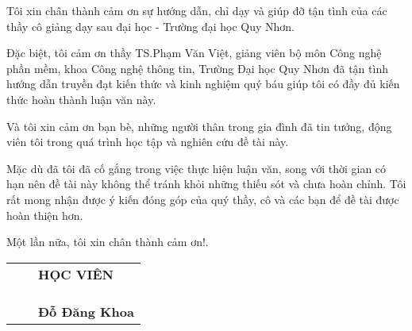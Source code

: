 
Tôi xin chân thành cảm ơn sự hướng dẫn, chỉ dạy và giúp đỡ tận tình của các thầy cô giảng dạy sau đại học - Trường đại học Quy Nhơn.

Đặc biệt, tôi cảm ơn thầy TS.Phạm Văn Việt, giảng viên bộ môn Công nghệ phần mềm, khoa Công nghệ thông tin, Trường Đại học Quy Nhơn đã tận tình hướng dẫn truyền đạt kiến thức và kinh nghiệm quý báu giúp tôi có đầy đủ kiến thức hoàn thành luận văn này.

Và tôi xin cảm ơn bạn bè, những người thân trong gia đình đã tin tưởng, động viên tôi trong quá trình học tập và nghiên cứu đề tài này.

Mặc dù đã tôi đã cố gắng trong việc thực hiện luận văn, song với thời gian có hạn nên đề tài này không thể tránh khỏi những thiếu sót và chưa hoàn chỉnh. Tôi rất mong nhận được ý kiến đóng góp của quý thầy, cô và các bạn để đề tài được hoàn thiện hơn.

Một lần nữa, tôi xin chân thành cảm ơn!.\\


\begin{tabu} to 1.0 \textwidth {  X[c] X[c]  X[c]   }

	 & &  \textbf{HỌC VIÊN} \\
	 \\ \\ \\ 
	 & &  \textbf{Đỗ Đăng Khoa}  \\
         
       \end{tabu}


